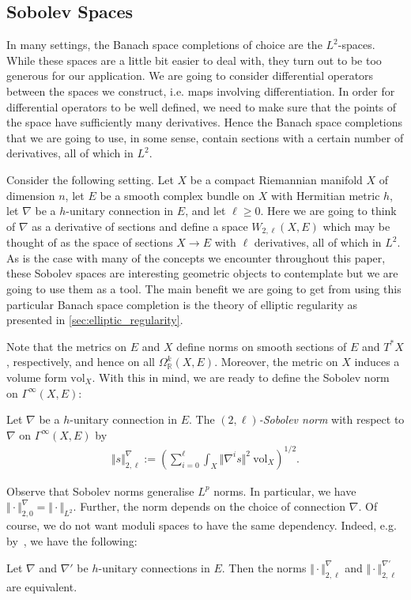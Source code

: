 \documentclass[12pt]{ociamthesis}  %
\begin{document}
\subsection{Sobolev Spaces}

In many settings, the Banach space completions of choice are the
$L^2$-spaces. While these spaces are a little bit easier to deal with,
they turn out to be too generous for our application. We are going to
consider differential operators between the spaces we construct,
i.e. maps involving differentiation. In order for differential operators
to be well defined, we need to make sure that the points of the space
have sufficiently many derivatives. Hence the Banach space completions
that we are going to use, in some sense, contain sections with a
certain number of derivatives, all of which in $L^2$.

Consider the following setting. Let $X$ be a compact
Riemannian manifold $X$ of dimension $n$, let $E$ be a smooth complex
bundle on $X$ with Hermitian metric $h$, let $\nabla$ be a $h$-unitary
connection in $E$, and let $\ell\geq 0$.
Here we are going to think of $\nabla$ as a derivative of sections and
define a space $W_{2,\ell}(X,E)$ which may be thought of as the space of
sections $X\to E$ with $\ell$ derivatives, all of which in $L^2$. As
is the case with many of the concepts we encounter throughout this paper,
these Sobolev spaces are interesting geometric objects to
contemplate but we are going to use them as a tool. The main
benefit we are going to get from using this particular Banach space
completion is the theory of elliptic regularity as presented in
\ref{sec:elliptic_regularity}.

Note that the metrics on $E$ and $X$ define norms on smooth sections
of $E$ and $T^*X$, respectively, and hence on all
$\Omega^k_{\mathbb{R}}(X,E)$.
Moreover, the metric on $X$ induces a volume form $\text{vol}_X$.
With this in mind, we are ready to define the Sobolev norm on
$\Gamma^\infty(X,E)$:

\begin{definition}
  Let $\nabla$ be a $h$-unitary connection in $E$.
  The \emph{$(2,\ell)$-Sobolev norm} with respect to $\nabla$ on
  $\Gamma^\infty(X,E)$ by
  \begin{align*}
    \Vert s\Vert_{2,\ell}^\nabla := \left(
    \sum_{i=0}^\ell \int_X \Vert \nabla^i s \Vert^2\:\text{vol}_X
    \right)^{1/2}.
  \end{align*}
\end{definition}

Observe that Sobolev norms generalise $L^p$ norms. In particular,
we have $\Vert\cdot\Vert^\nabla_{2,0} = \Vert\cdot\Vert_{L^2}$.
Further, the norm depends on the choice of connection $\nabla$. Of
course, we do not want moduli spaces to have the same dependency.
Indeed, e.g. by~\cite[Corollary 7.3]{shubin2001}, we have the following:
\begin{lemma}
  Let $\nabla$ and $\nabla'$ be $h$-unitary connections in $E$. Then the
  norms $\Vert\cdot\Vert_{2,\ell}^\nabla$ and
  $\Vert\cdot\Vert_{2,\ell}^{\nabla'}$ are equivalent.
\end{lemma}
\end{document}
